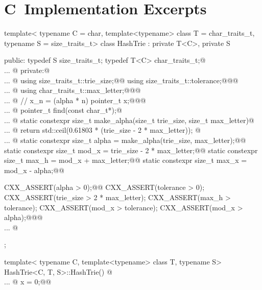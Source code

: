 \documentclass[a4paper,9pt,leqno]{article}
\makeatletter
\renewcommand{\=}{\protect\nobreakdash-\hspace{0pt}}
\renewcommand{\~}{\protect\nobreakdash--\hspace{0pt}}
\newcommand{\plusplus}{\textbf{\raisebox{1pt}{++}}}
\newcommand{\cplusplus}{\textbf{C}\plusplus}
\let\lst@ifskiplines\iffalse
\newcommand\skipnumbering[1]{%
	\setcounter{lstnumber}{\numexpr#1-1\relax}%
	\let\lst@ifskiplines\iftrue
	\\\lst@PlaceNumber
	\let\lst@ifskiplines\iffalse
	\lst@ifshowskiplines...\fi
}
\let\lst@PlaceNumber\@empty
\theoremstyle{plain}
\theoremstyle{definition}
\theoremstyle{remark}
\makeatother
\begin{document}
\section{\protect\cplusplus\ Implementation Excerpts}
%
%
\begin{hashtrielisting}[1983]
template<
	typename C = char,
	template<typename> class T = char_traits_t,
	typename S = size_traits_t>
class HashTrie :
	private T<C>,
	private S
{
public:
	typedef S size_traits_t;
	typedef T<C> char_traits_t;@\skipnumbering{2011}@
private:@\skipnumbering{2019}@
	using size_traits_t::trie_size;@\label{cpp-trie-size}@
	using size_traits_t::tolerance;@\label{cpp-tolerance}@@\skipnumbering{2022}@
	using char_traits_t::max_letter;@\label{cpp-max-letter}@@\skipnumbering{2207}@
	// x_n = (alpha * n) %
	pointer_t x;@\label{cpp-x}@@\skipnumbering{2226}@
	pointer_t find(const char_t*);@\skipnumbering{2232}@
	static constexpr size_t make_alpha(size_t trie_size, size_t max_letter)@\skipnumbering{2236}@
	{ return std::ceil(0.61803 * (trie_size - 2 * max_letter)); }@\skipnumbering{2243}@
	static constexpr size_t alpha = make_alpha(trie_size, max_letter);@\label{cpp-alpha}@
	static constexpr size_t mod_x = trie_size - 2 * max_letter;@\label{cpp-mod-x}@
	static constexpr size_t max_h = mod_x + max_letter;@\label{cpp-max-h}@
	static constexpr size_t max_x = mod_x - alpha;@\label{cpp-max-x}@

	CXX_ASSERT(alpha > 0);@\label{cpp-assert-begin}@
	CXX_ASSERT(tolerance > 0);
	CXX_ASSERT(trie_size > 2 * max_letter);
	CXX_ASSERT(max_h > tolerance);
	CXX_ASSERT(mod_x > tolerance);
	CXX_ASSERT(mod_x > alpha);@\label{cpp-assert-end}@@\skipnumbering{2273}@
};
\end{hashtrielisting}
%
%
\begin{hashtrielisting}[2275]
template<
	typename C,
	template<typename> class T,
	typename S>
HashTrie<C, T, S>::HashTrie()
{@\skipnumbering{2295}@
	x = 0;@\label{cpp-x-init}@
}
\end{hashtrielisting}
%
\end{document}
